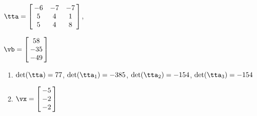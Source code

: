 {$\tta = \left[\hskip -3pt \begin{array}{ccc} -6&-7&-7\\  5&4&1
\\  5&4&8\end{array}\hskip -3pt \right] $,

$\vb = \left[\hskip -3pt \begin{array}{c} 58\\  -35
\\  -49\end{array}\hskip -3pt \right] $}
{\begin{enumerate}
\item	$\det(\tta) = 77$, $\det(\tta_1) = -385$, $\det(\tta_2) = -154$, $\det(\tta_3) = -154$
\item $\vx = \left[\hskip -3pt \begin{array}{c} -5\\  -2\\  
-2\end{array}\hskip -3pt \right] $
\end{enumerate}
}

